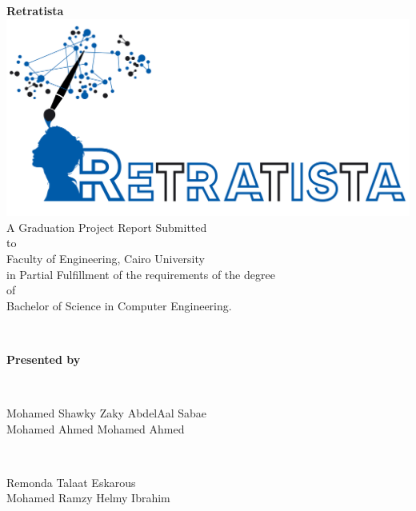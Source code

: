 \documentclass[a4paper,12pt]{article}
\begin{document}
\begin{titlepage}
\begin{minipage}{\textwidth}
\begin{center}
\textbf{\Huge Retratista} \\[0.25cm]
\includegraphics[scale=0.2]{images/logo.png} \\[0.25cm]
A Graduation Project Report Submitted \\[0.1cm]
to \\[0.1cm]
Faculty of Engineering, Cairo University \\[0.1cm]
in Partial Fulfillment of the requirements of the degree \\[0.1cm]
of \\[0.1cm]
Bachelor of Science in Computer Engineering. \\[0.1cm]
\end{center} 
\end{minipage} \\[1cm]
 
\begin{minipage}{\textwidth}
\begin{center}
\textbf{\Large Presented by}
\end{center} 
\end{minipage} \\[0.5cm]

\begin{minipage}{0.45\textwidth}
\begin{center} 
Mohamed Shawky Zaky AbdelAal Sabae \\[0.5cm]
Mohamed Ahmed Mohamed Ahmed
\end{center}
\end{minipage}
~
\begin{minipage}{0.45\textwidth}
\begin{center}
Remonda Talaat Eskarous \\[0.5cm]
Mohamed Ramzy Helmy Ibrahim
\end{center}
\end{minipage} \\[1cm]


\end{titlepage}
\end{document}
